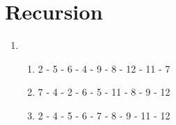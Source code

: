 \documentclass[sectionformat = exercise]{gadsescript}
\begin{document}
\maketitle
\section{Recursion}
\begin{enumerate}[label=\alph*)]
	\item 
	\begin{enumerate}[label=\alph*.]
		\item 2 - 5 - 6 - 4 - 9 - 8 - 12 - 11 - 7
		\item 7 - 4 - 2 - 6 - 5 - 11 - 8 - 9 - 12
		\item 2 - 4 - 5 - 6 - 7 - 8 - 9 - 11 - 12
	\end{enumerate}
\end{enumerate}
\end{document}
